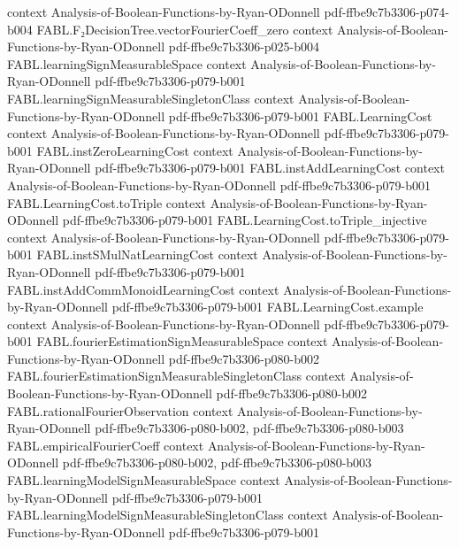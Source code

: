 \begin{theorem}
  {context}
  {Analysis-of-Boolean-Functions-by-Ryan-ODonnell}
  {pdf-ffbe9c7b3306-p074-b004}
\proofstep
  {FABL.F₂DecisionTree.vectorFourierCoeff_zero}
  {context}
  {Analysis-of-Boolean-Functions-by-Ryan-ODonnell}
  {pdf-ffbe9c7b3306-p025-b004}
\proofstep
  {FABL.learningSignMeasurableSpace}
  {context}
  {Analysis-of-Boolean-Functions-by-Ryan-ODonnell}
  {pdf-ffbe9c7b3306-p079-b001}
\proofstep
  {FABL.learningSignMeasurableSingletonClass}
  {context}
  {Analysis-of-Boolean-Functions-by-Ryan-ODonnell}
  {pdf-ffbe9c7b3306-p079-b001}
\proofstep
  {FABL.LearningCost}
  {context}
  {Analysis-of-Boolean-Functions-by-Ryan-ODonnell}
  {pdf-ffbe9c7b3306-p079-b001}
\proofstep
  {FABL.instZeroLearningCost}
  {context}
  {Analysis-of-Boolean-Functions-by-Ryan-ODonnell}
  {pdf-ffbe9c7b3306-p079-b001}
\proofstep
  {FABL.instAddLearningCost}
  {context}
  {Analysis-of-Boolean-Functions-by-Ryan-ODonnell}
  {pdf-ffbe9c7b3306-p079-b001}
\proofstep
  {FABL.LearningCost.toTriple}
  {context}
  {Analysis-of-Boolean-Functions-by-Ryan-ODonnell}
  {pdf-ffbe9c7b3306-p079-b001}
\proofstep
  {FABL.LearningCost.toTriple_injective}
  {context}
  {Analysis-of-Boolean-Functions-by-Ryan-ODonnell}
  {pdf-ffbe9c7b3306-p079-b001}
\proofstep
  {FABL.instSMulNatLearningCost}
  {context}
  {Analysis-of-Boolean-Functions-by-Ryan-ODonnell}
  {pdf-ffbe9c7b3306-p079-b001}
\proofstep
  {FABL.instAddCommMonoidLearningCost}
  {context}
  {Analysis-of-Boolean-Functions-by-Ryan-ODonnell}
  {pdf-ffbe9c7b3306-p079-b001}
\proofstep
  {FABL.LearningCost.example}
  {context}
  {Analysis-of-Boolean-Functions-by-Ryan-ODonnell}
  {pdf-ffbe9c7b3306-p079-b001}
\proofstep
  {FABL.fourierEstimationSignMeasurableSpace}
  {context}
  {Analysis-of-Boolean-Functions-by-Ryan-ODonnell}
  {pdf-ffbe9c7b3306-p080-b002}
\proofstep
  {FABL.fourierEstimationSignMeasurableSingletonClass}
  {context}
  {Analysis-of-Boolean-Functions-by-Ryan-ODonnell}
  {pdf-ffbe9c7b3306-p080-b002}
\proofstep
  {FABL.rationalFourierObservation}
  {context}
  {Analysis-of-Boolean-Functions-by-Ryan-ODonnell}
  {pdf-ffbe9c7b3306-p080-b002,
    pdf-ffbe9c7b3306-p080-b003}
\proofstep
  {FABL.empiricalFourierCoeff}
  {context}
  {Analysis-of-Boolean-Functions-by-Ryan-ODonnell}
  {pdf-ffbe9c7b3306-p080-b002,
    pdf-ffbe9c7b3306-p080-b003}
\proofstep
  {FABL.learningModelSignMeasurableSpace}
  {context}
  {Analysis-of-Boolean-Functions-by-Ryan-ODonnell}
  {pdf-ffbe9c7b3306-p079-b001}
\proofstep
  {FABL.learningModelSignMeasurableSingletonClass}
  {context}
  {Analysis-of-Boolean-Functions-by-Ryan-ODonnell}
  {pdf-ffbe9c7b3306-p079-b001}
\proofstep

\end{theorem}
